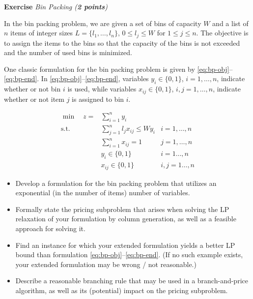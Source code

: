 \documentclass[a4paper,10pt]{article}
\newcounter{exc}
\newenvironment{exercise}[1]%
{\refstepcounter{exc}\textbf{Exercise \arabic{exc}} \emph{#1}\\}
{

\hrulefill\medskip}%
\begin{document}
\newpage

\begin{exercise}{Bin Packing (\textbf{2 points})}\label{ex:bpack}

In the bin packing problem, we are given a set of bins of capacity $W$ and a list of $n$ items of integer sizes $L=\{l_1, \dots, l_n\}$, $0\le l_j\le W$ for $1\le j\le n$. The objective is to assign the items to the bins so that the capacity of the bins is not exceeded and the number of used bins is minimized.

One classic formulation for the bin packing problem is given by \eqref{eq:bp-obj}--\eqref{eq:bp-end}. In \eqref{eq:bp-obj}--\eqref{eq:bp-end}, variables $y_i\in \{0,1\}$, $i=1,\dots, n$, indicate whether or not bin $i$ is used, while variables $x_{ij}\in \{0,1\}$, $i,j=1,\dots, n$, indicate whether or not item $j$ is assigned to bin $i$.

\begin{small}
\begin{align}
\min \quad z = & \sum_{i=1}^n y_i \label{eq:bp-obj} \\
\mbox{s.t.} & \sum_{j=1}^n l_j x_{ij} \le W y_i & i=1,\dots, n \\
	      & \sum_{i=1}^n x_{ij} = 1 & j=1,\dots, n \\
	& y_i\in \{0,1\} & i=1\dots, n \\
	& x_{ij}\in \{0,1\} & i,j=1\dots, n \label{eq:bp-end}
\end{align}
\end{small}

\begin{itemize}
\item Develop a formulation for the bin packing problem that utilizes an exponential (in the number of items) number of variables.
\item Formally state the pricing subproblem that arises when solving the LP relaxation of your formulation by column generation, as well as a feasible approach for solving it.
\item Find an instance for which your extended formulation yields a better LP bound than formulation \eqref{eq:bp-obj}--\eqref{eq:bp-end}. (If no such example exists, your extended formulation may be wrong / not reasonable.)
\item Describe a reasonable branching rule that may be used in a branch-and-price algorithm, as well as its (potential) impact on the pricing subproblem.
\end{itemize}
\end{exercise}
\end{document}
